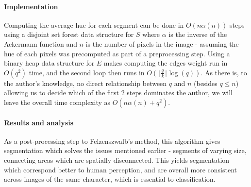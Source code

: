 \paragraph{Implementation} Computing the average hue for each segment can be done in $O(n\alpha(n))$ steps using a disjoint set forest data structure for $S$ where $\alpha$ is the inverse of the Ackermann function and $n$ is the number of pixels in the image - assuming the hue of each pixels was precomputed as part of a preprocessing step. Using a binary heap data structure for $E$ makes computing the edges weight run in $O(q^2)$ time, and the second loop then runs in $O(\lfloor \frac{q}{k} \rfloor \log(q))$. As there is, to the author's knowledge, no direct relationship between $q$ and $n$ (besides $q \leq n$) allowing us to decide which of the first $2$ steps dominates the author, we will leave the overall time complexity as $O(n\alpha(n) + q^2)$.

\paragraph{Results and analysis} As a post-processing step to Felzenszwalb's method, this algorithm gives segmentation which solves the issues mentioned earlier - segments of varying size, connecting areas which are spatially disconnected. This yields segmentation which correspond better to human perception, and are overall more consistent across images of the same character, which is essential to classification.